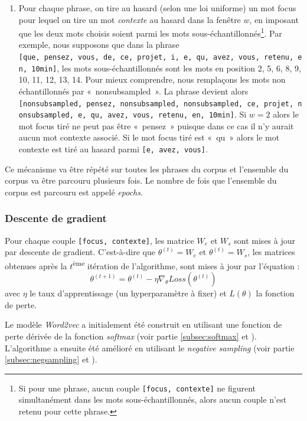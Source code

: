 \documentclass[11pt,french,french]{article}
\providecommand{\tightlist}{%
  \setlength{\parskip}{0pt}
  }
\let\rmarkdownfootnote\footnote%
\def\footnote{\protect\rmarkdownfootnote}
\begin{document}
\begin{enumerate}
\def\labelenumi{\arabic{enumi}.}
\setcounter{enumi}{1}
\tightlist
\item
  Pour chaque phrase, on tire au hasard (selon une loi uniforme) un mot
  focus pour lequel on tire un mot \emph{contexte} au hasard dans la
  fenêtre \(w\), en imposant que les deux mots choisis soient parmi les
  mots sous-échantillonnés\footnote{Si pour une phrase, aucun couple
    \texttt{{[}focus,\ contexte{]}} ne figurent simultanément dans les
    mots sous-échantillonnés, alors aucun couple n'est retenu pour cette
    phrase.}. Par exemple, nous supposons que dans la phrase
  \texttt{{[}que,\ pensez,\ vous,\ de,\ ce,\ projet,\ i,\ e,\ qu,\ avez,\ vous,\ retenu,\ en,\ 10min{]}},
  les mots sous-échantillonnés sont les mots en position 2, 5, 6, 8, 9,
  10, 11, 12, 13, 14. Pour mieux comprendre, nous remplaçons les mots
  non échantillonnés par «~nonsubsampled~». La phrase devient alors
  \texttt{{[}nonsubsampled,\ pensez,\ nonsubsampled,\ nonsubsampled,\ ce,\ projet,\ nonsubsampled,\ e,\ qu,\ avez,\ vous,\ retenu,\ en,\ 10min{]}}.
  Si \(w=2\) alors le mot focus tiré ne peut pas être «~pensez~» puisque
  dans ce cas il n'y aurait aucun mot contexte associé. Si le mot focus
  tiré est «~qu~» alors le mot contexte est tiré au hasard parmi
  \texttt{{[}e,\ avez,\ vous{]}}.
\end{enumerate}

Ce mécanisme va être répété sur toutes les phrases du corpus et
l'ensemble du corpus va être parcouru plusieurs fois. Le nombre de fois
que l'ensemble du corpus est parcouru est appelé \emph{epochs}.

\subsubsection{Descente de gradient}\label{subsec:descentedegradient}

Pour chaque couple \texttt{{[}focus,\ contexte{]}}, les matrice \(W_e\)
et \(W_s\) sont mises à jour par descente de gradient. C'est-à-dire que
\(\theta^{(t)} = W_e\) et \(\theta^{(t)} = W_s\), les matrices obtenues
après la \(t\)\textsuperscript{ème} itération de l'algorithme, sont
mises à jour par l'équation :
\[\theta^{(t+1)} = \theta^{(t)} - \eta \nabla_\theta Loss(\theta^{(t)})\]
avec \(\eta\) le taux d'apprentissage (un hyperparamètre à fixer) et
\(L(\theta)\) la fonction de perte.

Le modèle \emph{Word2vec} a initialement été construit en utilisant une
fonction de perte dérivée de la fonction \emph{softmax} (voir partie
\ref{subsec:softmax} et \cite{Mikolov}). L'algorithme a ensuite été
amélioré en utilisant le \emph{negative sampling} (voir partie
\ref{subsec:negsampling} et \cite{MikolovNS}).
\end{document}

